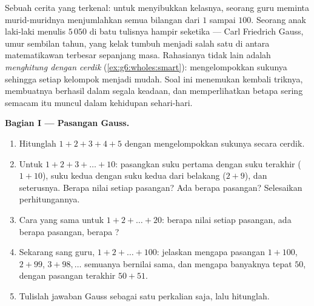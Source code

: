 \begin{problem}
\label{pb:g6:wholes:1}
Sebuah cerita yang terkenal: untuk menyibukkan kelasnya, seorang guru
meminta murid-muridnya menjumlahkan semua bilangan dari $1$ sampai
$100$. Seorang anak laki-laki menulis $5\,050$ di batu tulisnya
hampir seketika --- Carl Friedrich Gauss, umur sembilan tahun, yang
kelak tumbuh menjadi salah satu di antara matematikawan terbesar
sepanjang masa. Rahasianya tidak lain adalah \emph{menghitung dengan cerdik}
(\cref{ex:g6:wholes:smart}): mengelompokkan sukunya sehingga setiap
kelompok menjadi mudah. Soal ini menemukan kembali triknya, membuatnya
berhasil dalam segala keadaan, dan memperlihatkan betapa sering 
semacam itu muncul dalam kehidupan sehari-hari.

\medskip
\noindent\textbf{Bagian I --- Pasangan Gauss.}
\begin{enumerate}
  \item Hitunglah $1 + 2 + 3 + 4 + 5$ dengan mengelompokkan sukunya
        secara cerdik.
  \item Untuk $1 + 2 + 3 + \dots + 10$: pasangkan suku pertama dengan
        suku terakhir ($1 + 10$), suku kedua dengan suku kedua dari
        belakang ($2 + 9$), dan seterusnya. Berapa nilai setiap
        pasangan? Ada berapa pasangan? Selesaikan perhitungannya.
  \item Cara yang sama untuk $1 + 2 + \dots + 20$: berapa nilai
        setiap pasangan, ada berapa pasangan, berapa ?
  \item Sekarang  sang guru, $1 + 2 + \dots + 100$: jelaskan
        mengapa pasangan $1 + 100$, $2 + 99$, $3 + 98, \dots$
        semuanya bernilai sama, dan mengapa banyaknya tepat $50$,
        dengan pasangan terakhir $50 + 51$.
  \item Tulislah jawaban Gauss sebagai satu perkalian saja, lalu
        hitunglah.
\end{enumerate}


\end{problem}
